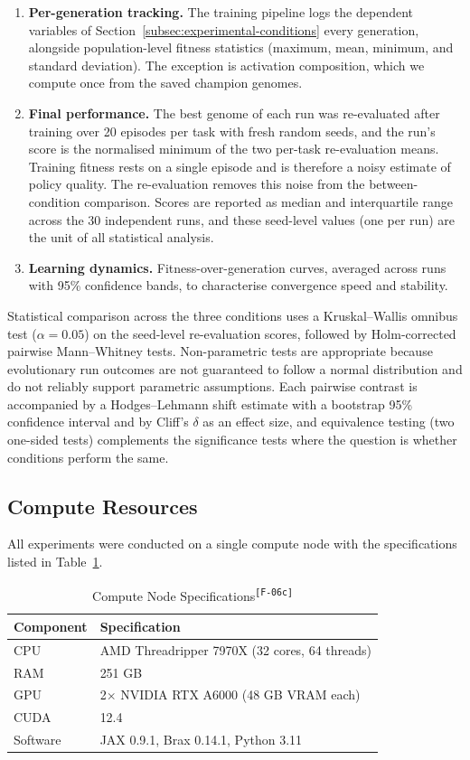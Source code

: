\documentclass[12pt]{article}
\newcommand{\revID}[1]{\textsuperscript{\scriptsize\texttt{[#1]}}}
\newcommand{\revFig}[2]{\textcolor{lrAmber}{#2}\revID{#1}}      %
\begin{document}
\begin{enumerate}
    \item \textbf{Per-generation tracking.} The training pipeline logs the dependent variables of Section~\ref{subsec:experimental-conditions} every generation, alongside population-level fitness statistics (maximum, mean, minimum, and standard deviation). The exception is activation composition, which we compute once from the saved champion genomes.
    \item \textbf{Final performance.} The best genome of each run was re-evaluated after training over 20 episodes per task with fresh random seeds, and the run's score is the normalised minimum of the two per-task re-evaluation means. Training fitness rests on a single episode and is therefore a noisy estimate of policy quality. The re-evaluation removes this noise from the between-condition comparison. Scores are reported as median and interquartile range across the 30 independent runs, and these seed-level values (one per run) are the unit of all statistical analysis.
    \item \textbf{Learning dynamics.} Fitness-over-generation curves, averaged across runs with 95\% confidence bands, to characterise convergence speed and stability.
\end{enumerate}

Statistical comparison across the three conditions uses a Kruskal--Wallis omnibus test ($\alpha = 0.05$) on the seed-level re-evaluation scores, followed by Holm-corrected pairwise Mann--Whitney tests.
Non-parametric tests are appropriate because evolutionary run outcomes are not guaranteed to follow a normal distribution and do not reliably support parametric assumptions.
Each pairwise contrast is accompanied by a Hodges--Lehmann shift estimate with a bootstrap 95\% confidence interval and by Cliff's $\delta$ as an effect size, and equivalence testing (two one-sided tests) complements the significance tests where the question is whether conditions perform the same.

\subsection{Compute Resources}
\label{subsec:compute-resources}

All experiments were conducted on a single compute node with the specifications listed in Table~\ref{tab:compute-node}.

\begin{table}[h]
\centering
\caption{\revFig{F-06c}{Compute Node Specifications}}
\label{tab:compute-node}
\begin{tabular}{ll}
\toprule
\textbf{Component} & \textbf{Specification} \\
\midrule
CPU & AMD Threadripper 7970X (32 cores, 64 threads) \\
RAM & 251 GB \\
GPU & 2$\times$ NVIDIA RTX A6000 (48 GB VRAM each) \\
CUDA & 12.4 \\
Software & JAX 0.9.1, Brax 0.14.1, Python 3.11 \\
\bottomrule
\end{tabular}
\end{table}
\end{document}
